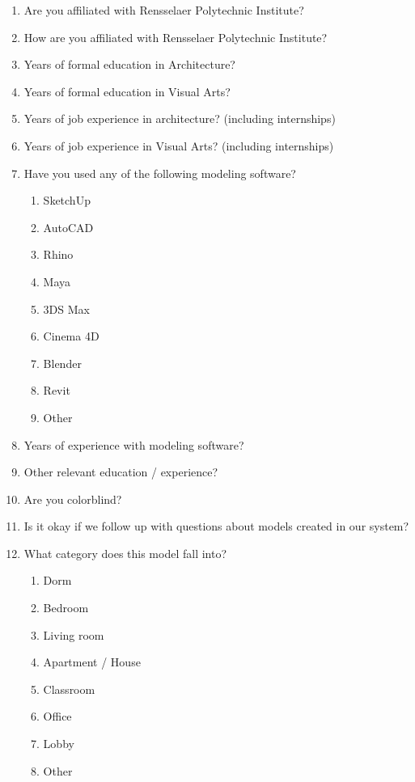\documentclass[12pt]{article}
\begin{document}
\begin{enumerate}  

        \item Are you affiliated with Rensselaer Polytechnic Institute? 
        \item How are you affiliated with Rensselaer Polytechnic Institute?
        \item Years of formal education in Architecture?
        \item Years of formal education in Visual Arts?
        \item Years of job experience in architecture? (including internships) 
        \item Years of job experience in Visual Arts? (including internships)
        \item Have you used any of the following modeling software?
        \begin{enumerate}  
          \item SketchUp
          \item AutoCAD
          \item Rhino
          \item Maya
          \item 3DS Max
          \item Cinema 4D
          \item Blender
          \item Revit
          \item Other
        \end{enumerate}
        \item Years of experience with modeling software?
        \item Other relevant education / experience?
        \item Are you colorblind?
        \item Is it okay if we follow up with questions about models created in our system?
        \item What category does this model fall into?
        \begin{enumerate}
          \item Dorm
          \item Bedroom
          \item Living room 
          \item Apartment / House
          \item Classroom
          \item Office
          \item Lobby
          \item Other

\end{enumerate}
\end{enumerate}
\end{document}
